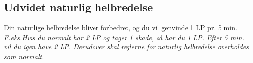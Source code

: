 
\subsection{Udvidet naturlig helbredelse}
Din naturlige helbredelse bliver forbedret, og du vil genvinde 1 LP pr. 5 min.\\ 
\textit{F.eks.\newline Hvis du normalt har 2 LP og tager 1 skade, så har du 1 LP. Efter 5 min. vil du igen have 2 LP. Derudover skal reglerne for naturlig helbredelse overholdes som normalt.}